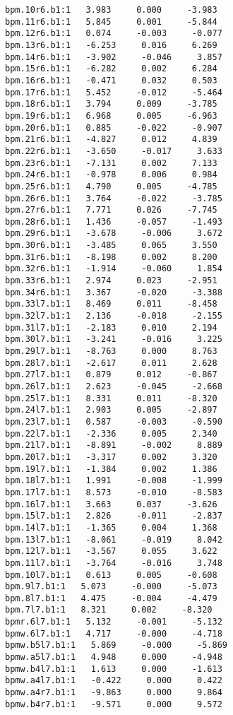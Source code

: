 \begin{verbatim}
bpm.10r6.b1:1   3.983     0.000     -3.983
bpm.11r6.b1:1   5.845     0.001     -5.844
bpm.12r6.b1:1   0.074     -0.003     -0.077
bpm.13r6.b1:1   -6.253     0.016     6.269
bpm.14r6.b1:1   -3.902     -0.046     3.857
bpm.15r6.b1:1   -6.282     0.002     6.284
bpm.16r6.b1:1   -0.471     0.032     0.503
bpm.17r6.b1:1   5.452     -0.012     -5.464
bpm.18r6.b1:1   3.794     0.009     -3.785
bpm.19r6.b1:1   6.968     0.005     -6.963
bpm.20r6.b1:1   0.885     -0.022     -0.907
bpm.21r6.b1:1   -4.827     0.012     4.839
bpm.22r6.b1:1   -3.650     -0.017     3.633
bpm.23r6.b1:1   -7.131     0.002     7.133
bpm.24r6.b1:1   -0.978     0.006     0.984
bpm.25r6.b1:1   4.790     0.005     -4.785
bpm.26r6.b1:1   3.764     -0.022     -3.785
bpm.27r6.b1:1   7.771     0.026     -7.745
bpm.28r6.b1:1   1.436     -0.057     -1.493
bpm.29r6.b1:1   -3.678     -0.006     3.672
bpm.30r6.b1:1   -3.485     0.065     3.550
bpm.31r6.b1:1   -8.198     0.002     8.200
bpm.32r6.b1:1   -1.914     -0.060     1.854
bpm.33r6.b1:1   2.974     0.023     -2.951
bpm.34r6.b1:1   3.367     -0.020     -3.388
bpm.33l7.b1:1   8.469     0.011     -8.458
bpm.32l7.b1:1   2.136     -0.018     -2.155
bpm.31l7.b1:1   -2.183     0.010     2.194
bpm.30l7.b1:1   -3.241     -0.016     3.225
bpm.29l7.b1:1   -8.763     0.000     8.763
bpm.28l7.b1:1   -2.617     0.011     2.628
bpm.27l7.b1:1   0.879     0.012     -0.867
bpm.26l7.b1:1   2.623     -0.045     -2.668
bpm.25l7.b1:1   8.331     0.011     -8.320
bpm.24l7.b1:1   2.903     0.005     -2.897
bpm.23l7.b1:1   0.587     -0.003     -0.590
bpm.22l7.b1:1   -2.336     0.005     2.340
bpm.21l7.b1:1   -8.891     -0.002     8.889
bpm.20l7.b1:1   -3.317     0.002     3.320
bpm.19l7.b1:1   -1.384     0.002     1.386
bpm.18l7.b1:1   1.991     -0.008     -1.999
bpm.17l7.b1:1   8.573     -0.010     -8.583
bpm.16l7.b1:1   3.663     0.037     -3.626
bpm.15l7.b1:1   2.826     -0.011     -2.837
bpm.14l7.b1:1   -1.365     0.004     1.368
bpm.13l7.b1:1   -8.061     -0.019     8.042
bpm.12l7.b1:1   -3.567     0.055     3.622
bpm.11l7.b1:1   -3.764     -0.016     3.748
bpm.10l7.b1:1   0.613     0.005     -0.608
bpm.9l7.b1:1   5.073     -0.000     -5.073
bpm.8l7.b1:1   4.475     -0.004     -4.479
bpm.7l7.b1:1   8.321     0.002     -8.320
bpmr.6l7.b1:1   5.132     -0.001     -5.132
bpmw.6l7.b1:1   4.717     -0.000     -4.718
bpmw.b5l7.b1:1   5.869     -0.000     -5.869
bpmw.a5l7.b1:1   4.948     0.000     -4.948
bpmw.b4l7.b1:1   1.613     0.000     -1.613
bpmw.a4l7.b1:1   -0.422     0.000     0.422
bpmw.a4r7.b1:1   -9.863     0.000     9.864
bpmw.b4r7.b1:1   -9.571     0.000     9.572

\end{verbatim}
